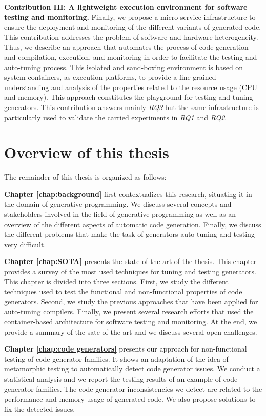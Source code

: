 \textbf{Contribution III: A lightweight execution environment for software testing and monitoring.}
Finally, we propose a micro-service infrastructure to ensure the deployment and monitoring of the different variants of generated code. This contribution addresses the problem of software and hardware heterogeneity. Thus, we describe an approach that automates the process of code generation and compilation, execution, and monitoring in order to facilitate the testing and auto-tuning process.
This isolated and sand-boxing environment is based on system containers, as execution platforms, to provide a fine-grained understanding and analysis of the properties related to the resource usage (CPU and memory). 
This approach constitutes the playground for testing and tuning generators. This contribution answers mainly \textit{RQ3} but the same infrastructure is particularly used to validate the carried experiments in \textit{RQ1} and \textit{RQ2}.

\section{Overview of this thesis}
The remainder of this thesis is organized  as follows:

\textbf{Chapter \ref{chap:background}} first contextualizes this research, situating it in the domain of generative programming. We discuss several concepts and stakeholders involved in the field of generative programming as well as an overview of the different aspects of automatic code generation. Finally, we discuss the different problems that make the task of generators auto-tuning and testing very difficult.

\textbf{Chapter \ref{chap:SOTA}} presents the state of the art of the thesis. This chapter provides a survey of the most used techniques for tuning and testing generators.
This chapter is divided into three sections. First, we study the different techniques used to test the functional and non-functional properties of code generators. Second, we study the previous approaches that have been applied for auto-tuning compilers. Finally, we present several research efforts that used the container-based architecture for software testing and monitoring. At the end, we provide a summary of the sate of the art and we discuss several open challenges.

\textbf{Chapter \ref{chap:code generators}} presents our approach for non-functional testing of code generator families. It shows an adaptation of the idea of metamorphic testing to automatically detect code generator issues. We conduct a statistical analysis and we report the testing results of an example of code generator families. The code generator inconsistencies we detect are related to the performance and memory usage of generated code. We also propose solutions to fix the detected issues.

